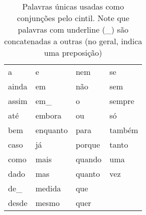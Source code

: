 \begin{table}[!ht]
    \centering
    \begin{tabular}{|l|l|l|l|}
        \hline
        a & e & nem & se\\
        ainda & em & não & sem\\
        assim & em\_ & o & sempre\\
        até & embora & ou & só\\
        bem & enquanto & para & também\\
        caso & já & porque & tanto\\
        como & mais & quando & uma\\
        dado & mas & quanto & vez\\
        de\_ & medida & que & \\
        desde & mesmo & quer & \\
        \hline
    \end{tabular}
    \caption{Palavras únicas usadas como conjunções pelo cintil. Note que palavras com underline (\_) são concatenadas a outras (no geral, indica uma preposição)}
    \label{tab:tab_conj_separadas_cintil}
\end{table}